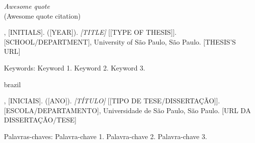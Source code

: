 \documentclass[
  12pt,
  a4paper,
  oneside]{tesesusp}
\begin{document}

\begin{epigrafe}
  \vspace*{\fill}
	\begin{flushright}
	  \textit{Awesome quote} \\
		(Awesome quote citation)
	\end{flushright}
\end{epigrafe}


\setlength{\absparsep}{18pt}
\begin{resumo}

\begin{flushleft}
[SURNAME], [INITIALS]. ([YEAR]). \textit{[TITLE]} [[TYPE OF THESIS]]. [SCHOOL/DEPARTMENT], University of São Paulo, São Paulo. [THESIS'S URL]
\end{flushleft}

\lipsum[1]

Keywords: Keyword 1. Keyword 2. Keyword 3.
\end{resumo}


\begin{resumo}[RESUMO]
\begin{otherlanguage*}{brazil}

\begin{flushleft}
[SOBRENOME], [INICIAIS]. ([ANO]). \textit{[TÍTULO]} [[TIPO DE TESE/DISSERTAÇÃO]]. [ESCOLA/DEPARTAMENTO], Universidade de São Paulo, São Paulo. [URL DA DISSERTAÇÃO/TESE]
\end{flushleft}

\lipsum[1]

Palavras-chaves: Palavra-chave 1. Palavra-chave 2. Palavra-chave 3.
\end{otherlanguage*}
\end{resumo}

\end{document}
